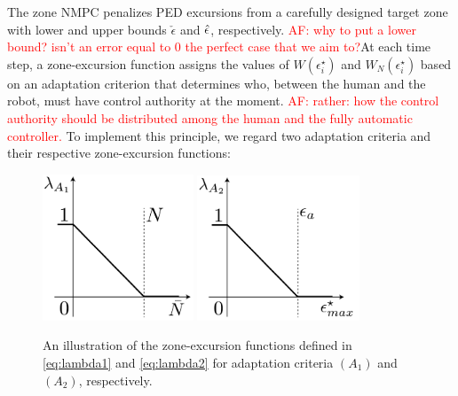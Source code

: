 The zone NMPC penalizes PED excursions from a carefully designed target zone with lower and upper bounds $\check{\epsilon}$ and $\Hat{\epsilon}$, respectively. \textcolor{red}{AF: why to put a lower bound? isn't an error equal to $0$ the perfect case that we aim to?}At each time step, a zone-excursion function assigns the values of $W(\epsilon_i^\star)$ and ${W}_N(\epsilon_i^\star)$ based on an adaptation criterion that determines who, between the human and the robot, must have control authority at the moment. \textcolor{red}{AF: rather: how the control authority should be distributed among the human and the fully automatic controller.} To implement this principle, we regard two adaptation criteria and their respective zone-excursion functions: 
\begin{figure}
	\includegraphics[width=0.40\textwidth]{figure/basic_function_a1}\hfill
	\includegraphics[width=0.43\textwidth]{figure/basic_function_a2}
	\caption{An illustration of the zone-excursion functions defined in \eqref{eq:lambda1} and \eqref{eq:lambda2} for adaptation criteria $(A_1)$ and $(A_2)$, respectively.}\label{fig:zone_functions}%
\end{figure}
